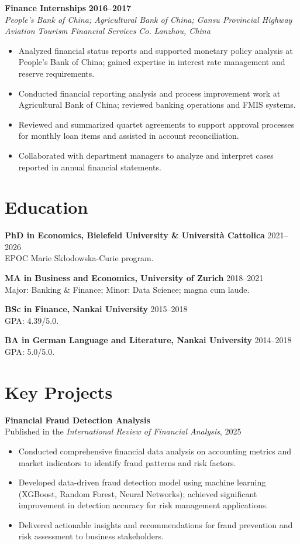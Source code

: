 \documentclass[a4paper,11pt]{article}
\newcommand{\role}[4]{%
  \textbf{#1} \hfill \textbf{#2}\\
  \textit{#3} \hfill \textit{#4}\par
}
\newcommand{\project}[2]{%
  \textbf{#1}\\[-1pt]
  \textcolor{muted}{\small #2}\par
}
\begin{document}
\role{Finance Internships}{2016--2017}{People's Bank of China; Agricultural Bank of China; Gansu Provincial Highway Aviation Tourism Financial Services Co.}{Lanzhou, China}
\begin{itemize}
  \item Analyzed financial status reports and supported monetary policy analysis at People's Bank of China; gained expertise in interest rate management and reserve requirements.
  \item Conducted financial reporting analysis and process improvement work at Agricultural Bank of China; reviewed banking operations and FMIS systems.
  \item Reviewed and summarized quartet agreements to support approval processes for monthly loan items and assisted in account reconciliation.
  \item Collaborated with department managers to analyze and interpret cases reported in annual financial statements.
\end{itemize}

 


\section{Education}
\textbf{PhD in Economics, Bielefeld University \& Universit\`a Cattolica} \hfill 2021--2026\\
EPOC Marie Sk\l odowska-Curie program.

\textbf{MA in Business and Economics, University of Zurich} \hfill 2018--2021\\
Major: Banking \& Finance; Minor: Data Science; magna cum laude.

\textbf{BSc in Finance, Nankai University} \hfill 2015--2018\\
GPA: 4.39/5.0.

\textbf{BA in German Language and Literature, Nankai University} \hfill 2014--2018\\
GPA: 5.0/5.0.

\section{Key Projects}
\project{Financial Fraud Detection Analysis}{Published in the \textit{International Review of Financial Analysis}, 2025}
\begin{itemize}
  \item Conducted comprehensive financial data analysis on accounting metrics and market indicators to identify fraud patterns and risk factors.
  \item Developed data-driven fraud detection model using machine learning (XGBoost, Random Forest, Neural Networks); achieved significant improvement in detection accuracy for risk management applications.
  \item Delivered actionable insights and recommendations for fraud prevention and risk assessment to business stakeholders.
\end{itemize}
\end{document}
